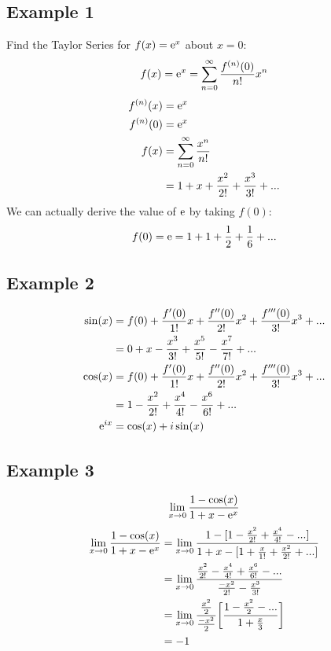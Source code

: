 \documentclass{math}
\begin{document}
\subsection*{Example 1}
Find the Taylor Series for \( f(x)= \mathrm{e}^{x} \) about \( x = 0 \):
\[ f(x) = \mathrm{e}^{x} = \sum_{n=0}^{\infty}\frac{f^{(n)}(0)}{n!}x^{n} \]
\begin{align*}
  f^{(n)}(x) &= \mathrm{e}^{x} \\
  f^{(n)}(0) &= \mathrm{e}^{x} \\
  f(x) &= \sum_{n=0}^{\infty}\frac{x^{n}}{n!} \\
  &= 1+x+\frac{x^{2}}{2!}+\frac{x^{3}}{3!}+...
\end{align*}
We can actually derive the value of \( \mathrm{e} \) by taking \( f(0) \):
\[ f(0) = \mathrm{e} = 1+1+\frac{1}{2}+\frac{1}{6}+... \]

\subsection*{Example 2}
\begin{align*}
  \sin(x) &= f(0)+\frac{f'(0)}{1!}x+\frac{f''(0)}{2!}x^{2}+
    \frac{f'''(0)}{3!}x^{3}+... \\
  &= 0+x-\frac{x^{3}}{3!}+\frac{x^{5}}{5!}-\frac{x^{7}}{7!}+... \\
  \cos(x) &= f(0)+\frac{f'(0)}{1!}x+\frac{f''(0)}{2!}x^{2}+
    \frac{f'''(0)}{3!}x^{3}+... \\
  &= 1-\frac{x^{2}}{2!}+\frac{x^{4}}{4!}-\frac{x^{6}}{6!}+... \\
  \mathrm{e}^{ix} &= \cos(x)+i\sin(x)
\end{align*}

\subsection*{Example 3}
\[ \lim_{x\to0}\frac{1-\cos(x)}{1+x-\mathrm{e}^{x}} \]
\begin{align*}
  \lim_{x\to0}\frac{1-\cos(x)}{1+x-\mathrm{e}^{x}} &=
    \lim_{x\to0}\frac{1-[1-\frac{x^{2}}{2!}+\frac{x^{4}}{4!}-...]}
      {1+x-[1+\frac{x}{1!}+\frac{x^{2}}{2!}+...]} \\
  &= \lim_{x\to0}\frac{\frac{x^{2}}{2!}-\frac{x^{4}}{4!}+\frac{x^{6}}{6!}-...}
    {\frac{-x^{2}}{2!}-\frac{x^{3}}{3!}} \\
  &= \lim_{x\to0}\frac{\frac{x^{2}}{2}}{\frac{-x^{2}}{2}}
    \bigg[\frac{1-\frac{x^{2}}{2}-...}{1+\frac{x}{3}}\bigg] \\
  &= -1
\end{align*}
\end{document}
